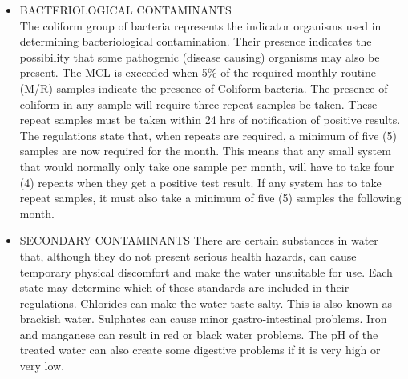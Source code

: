 \begin{itemize}
\item BACTERIOLOGICAL CONTAMINANTS  \\
The coliform group of bacteria represents the indicator organisms used in determining bacteriological contamination. Their presence indicates the possibility that some pathogenic (disease causing) organisms may also be present. The MCL is exceeded when 5\% of the required monthly routine (M/R) samples indicate the presence of Coliform bacteria. The presence of coliform in any sample will require three repeat samples be taken. These repeat samples must be taken within 24 hrs of notification of positive results.  \\
The regulations state that, when repeats are required, a minimum of five (5) samples are now required for the month. This means that any small system that would normally only take one sample per month, will have to take four (4) repeats when they get a positive test result. If any system has to take repeat samples, it must also take a minimum of five (5) samples the following month.  \\
\item SECONDARY CONTAMINANTS There are certain substances in water that, although they do not present serious health hazards, can cause temporary physical discomfort and make the water unsuitable for use. Each state may determine which of these standards are included in their regulations. Chlorides can make the water taste salty. This is also known as brackish water. Sulphates can cause minor gastro-intestinal problems. Iron and manganese can result in red or black water problems. The pH of the treated water can also create some digestive problems if it is very high or very low.
\end{itemize}
